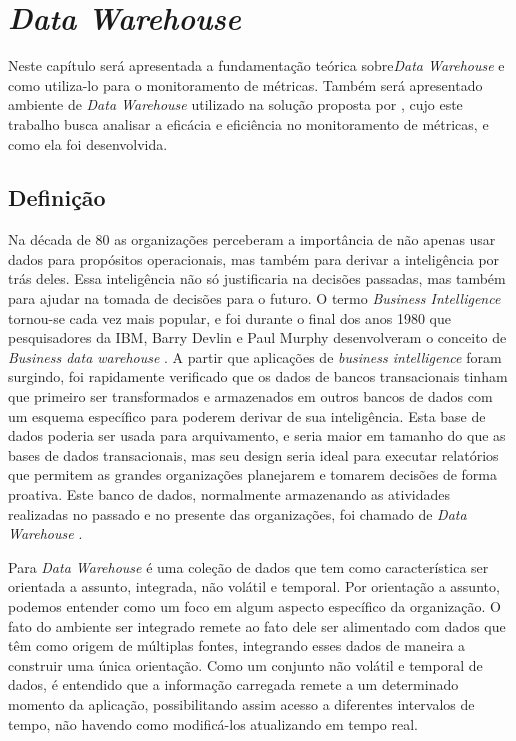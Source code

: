 \chapter{\textit{Data Warehouse}} 
\label{chap:arquitetura}

Neste capítulo será apresentada a fundamentação teórica sobre\textit{Data Warehouse} e como utiliza-lo para o monitoramento de métricas. Também será apresentado ambiente de \textit{Data Warehouse} utilizado na solução proposta por , cujo este trabalho busca analisar a eficácia e eficiência no monitoramento de métricas,  e como ela foi desenvolvida.  

\section{Definição}

Na década de 80 as organizações perceberam a importância de não apenas usar dados para propósitos operacionais, mas também para derivar a inteligência por trás deles. Essa inteligência não só justificaria na decisões passadas, mas também para ajudar na tomada de decisões para o futuro. O termo \textit{Business Intelligence} tornou-se cada vez mais popular, e foi durante o final dos anos 1980 que pesquisadores da IBM, Barry Devlin e Paul Murphy desenvolveram o conceito de \textit{Business data warehouse }. A partir que aplicações de \textit{business intelligence } foram surgindo, foi rapidamente verificado que os dados de bancos transacionais tinham que primeiro ser transformados e armazenados em outros bancos de dados com um esquema específico para poderem derivar de sua inteligência. Esta base de dados poderia ser usada para arquivamento, e seria maior em tamanho do que as bases de dados transacionais, mas seu design seria ideal para executar relatórios que permitem as grandes organizações planejarem e tomarem decisões de forma proativa. Este banco de dados, normalmente armazenando as atividades realizadas no passado e no presente das organizações, foi chamado de \textit{Data Warehouse} \cite{neeraj_sharma_2011}.

Para \cite{Inmon2002} \textit{Data Warehouse} é uma coleção de dados que tem como característica ser orientada a assunto, integrada, não volátil e temporal. Por orientação a assunto, podemos entender como um foco em algum aspecto específico da organização. O fato do ambiente ser integrado remete ao fato dele ser alimentado com dados que têm como origem de múltiplas fontes, integrando esses dados de maneira a construir uma única orientação. Como um conjunto não volátil e temporal de dados, é entendido que a informação carregada remete a um determinado momento da aplicação, possibilitando assim acesso a diferentes intervalos de tempo, não havendo como modificá-los atualizando em tempo real.

